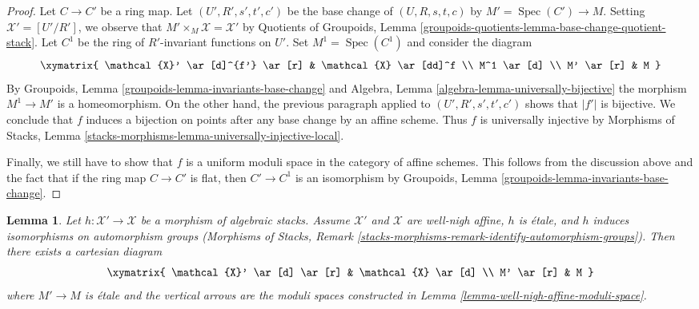 \documentclass[10pt,a4paper]{amsart}
\theoremstyle{plain}
\newtheorem{lemma}[subsection]{Lemma}
\theoremstyle{definition}
\theoremstyle{remark}
\numberwithin{equation}{subsection}
\def\Spec{\mathop{\mathrm{Spec}}}
\begin{document}
\begin{proof}
\medskip\noindent
Let $C \to C'$ be a ring map. Let $(U', R', s', t', c')$ be
the base change of $(U, R, s, t, c)$ by $M' = \Spec(C') \to M$.
Setting $\mathcal{X}' = [U'/R']$, we observe that
$M' \times_M \mathcal{X} = \mathcal{X}'$ by
Quotients of Groupoids, Lemma
\ref{groupoids-quotients-lemma-base-change-quotient-stack}.
Let $C^1$ be the ring of $R'$-invariant functions on $U'$.
Set $M^1 = \Spec(C^1)$ and consider the diagram
$$
\xymatrix{
\mathcal{X}' \ar[d]^{f'} \ar[r] & \mathcal{X} \ar[dd]^f \\
M^1 \ar[d] \\
M' \ar[r] & M
}
$$
By Groupoids, Lemma \ref{groupoids-lemma-invariants-base-change} and
Algebra, Lemma \ref{algebra-lemma-universally-bijective}
the morphism $M^1 \to M'$ is a homeomorphism.
On the other hand, the previous paragraph applied to
$(U', R', s', t', c')$ shows that $|f'|$ is bijective.
We conclude that $f$ induces a bijection on points after any
base change by an affine scheme. Thus $f$ is universally injective
by Morphisms of Stacks, Lemma
\ref{stacks-morphisms-lemma-universally-injective-local}.

\medskip\noindent
Finally, we still have to show that $f$ is a uniform moduli space
in the category of affine schemes. This follows from the discussion
above and the fact that if the
ring map $C \to C'$ is flat, then $C' \to C^1$ is an isomorphism
by Groupoids, Lemma \ref{groupoids-lemma-invariants-base-change}.
\end{proof}

\begin{lemma}
\label{lemma-well-nigh-affine-moduli-space-etale}
Let $h : \mathcal{X}' \to \mathcal{X}$ be a morphism of algebraic stacks.
Assume $\mathcal{X}'$ and $\mathcal{X}$ are well-nigh affine,
$h$ is \'etale, and $h$ induces isomorphisms on automorphism groups
(Morphisms of Stacks, Remark
\ref{stacks-morphisms-remark-identify-automorphism-groups}).
Then there exists a cartesian diagram
$$
\xymatrix{
\mathcal{X}' \ar[d] \ar[r] & \mathcal{X} \ar[d] \\
M' \ar[r] & M
}
$$
where $M' \to M$ is \'etale and
the vertical arrows are the moduli spaces constructed in
Lemma \ref{lemma-well-nigh-affine-moduli-space}.
\end{lemma}
\end{document}
